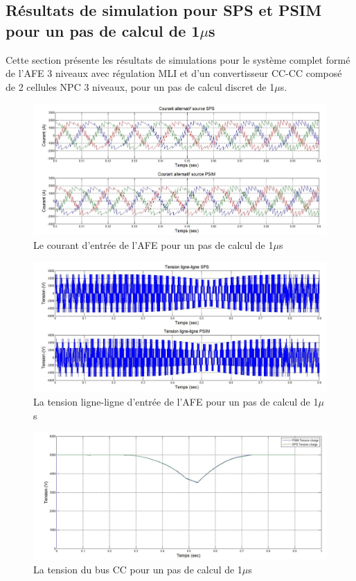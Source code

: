 \subsection{Résultats de simulation pour SPS et PSIM pour un pas de calcul de 1$\mu$s}
Cette section présente les résultats de simulations pour le système complet formé de l'AFE 3 niveaux avec régulation MLI et d'un convertisseur CC-CC composé de 2 cellules NPC 3 niveaux, pour un pas de calcul discret de 1$\mu$s. 

\begin{figure}[htb]
\centering
\includegraphics[scale=0.5]{fig/DCP_AFE/1u/cour_al.jpg}
\caption{Le courant d'entrée de l'AFE pour un pas de calcul de 1$\mu$s}
\label{AF_DC_cou1}
\end{figure}


\begin{figure}[htb]
\centering
\includegraphics[scale=0.5]{fig/DCP_AFE/1u/ten_ligne_ligne.jpg}
\caption{La tension ligne-ligne d'entrée de l'AFE pour un pas de calcul de 1$\mu$s}
\label{AF_DC_ten1}
\end{figure}


\begin{figure}[htb]
\centering
\includegraphics[scale=0.5]{fig/DCP_AFE/1u/ten_bus.jpg}
\caption{La tension du bus CC pour un pas de calcul de 1$\mu$s}
\label{AF_DC_vch1}
\end{figure}



